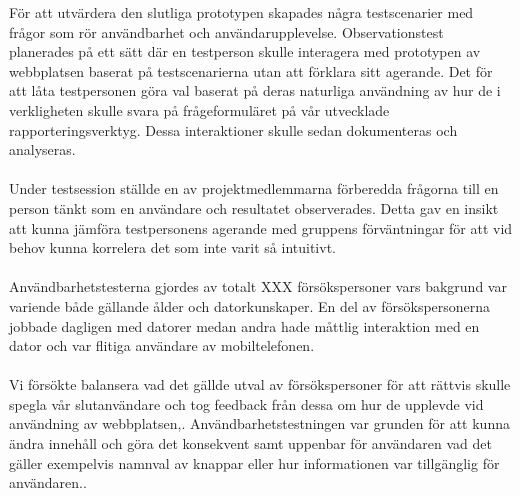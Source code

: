 \documentclass[12pt]{article}
\begin{document}
För att utvärdera den slutliga prototypen skapades några testscenarier med frågor som rör användbarhet och användarupplevelse. Observationstest planerades på ett sätt där en  testperson skulle interagera med prototypen av webbplatsen baserat på testscenarierna utan att förklara sitt agerande. Det för att låta testpersonen göra val baserat på deras naturliga användning av hur de i verkligheten skulle svara på frågeformuläret på vår utvecklade rapporteringsverktyg. Dessa interaktioner skulle sedan dokumenteras och  analyseras.\\\\
Under testsession ställde en av projektmedlemmarna förberedda frågorna till en person tänkt som en användare och resultatet observerades. Detta gav en insikt att kunna jämföra testpersonens agerande med gruppens förväntningar för att vid behov kunna korrelera det som inte varit så intuitivt.\\\\
Användbarhetstesterna gjordes av totalt XXX försökspersoner vars bakgrund var variende både gällande ålder och datorkunskaper. En del av försökspersonerna jobbade dagligen med datorer medan andra hade måttlig interaktion med en dator och var flitiga användare av mobiltelefonen. \\\\
Vi försökte balansera vad det gällde utval av försökspersoner för att rättvis skulle spegla vår slutanvändare och tog feedback från dessa om hur de upplevde vid användning av webbplatsen,. Användbarhetstestningen var grunden för att kunna ändra innehåll och göra det konsekvent  samt uppenbar för användaren vad det gäller exempelvis namnval av knappar eller hur informationen var tillgänglig för användaren.. 
\end{document}

